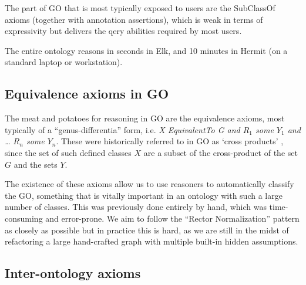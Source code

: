 \documentclass{llncs}
\begin{document}
The part of GO that is most typically exposed to users are the
SubClassOf axioms (together with annotation assertions), which is weak
in terms of expressivity but delivers the qery abilities required by
most users.

The entire ontology reasons in seconds in Elk\cite{kazakov2012elk}, and 10
minutes in Hermit (on a standard laptop or workstation).

\subsection{Equivalence axioms in GO}

The meat and potatoes for reasoning in GO are the equivalence axioms,
most typically of a ``genus-differentia'' form, i.e. \emph{X
  EquivalentTo G and $R_1$ some $Y_1$ and … $R_n$ some $Y_n$}. These were
historically referred to in GO as `cross
products' \cite{Mungall2010GOXP}, since the set of such defined classes
$X$ are a subset of the cross-product of the set $G$ and the sets
$Y$.

The existence of these axioms allow us to use reasoners to
automatically classify the GO, something that is vitally important in
an ontology with such a large number of classes. This was previously
done entirely by hand, which was time-consuming and error-prone. We
aim to follow the ``Rector Normalization''
pattern\cite{rector_modularisation_2003} as closely as possible but in
practice this is hard, as we are still in the midst of refactoring a
large hand-crafted graph with multiple built-in hidden assumptions. 


\subsection{Inter-ontology axioms}
\end{document}
